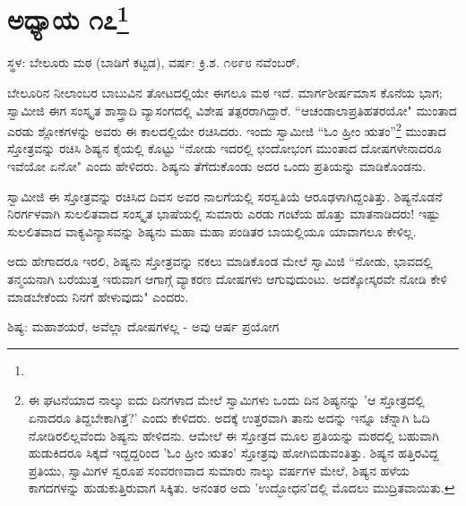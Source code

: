 \newpage

\chapter[ಅಧ್ಯಾಯ ೧೭]{ಅಧ್ಯಾಯ ೧೭\protect\footnote{}}

\centerline{ಸ್ಥಳ: ಬೇಲೂರು ಮಠ (ಬಾಡಿಗೆ ಕಟ್ಟಡ), ವರ್ಷ: ಕ್ರಿ.ಶ. ೧೮೯೮ ನವೆಂಬರ್.}

ಬೇಲೂರಿನ ನೀಲಾಂಬರ ಬಾಬುವಿನ ತೋಟದಲ್ಲಿಯೇ ಈಗಲೂ ಮಠ ಇದೆ. ಮಾರ್ಗಶೀರ್ಷಮಾಸ ಕೊನೆಯ ಭಾಗ; ಸ್ವಾಮೀಜಿ ಈಗ ಸಂಸ್ಕೃತ ಶಾಸ್ತ್ರಾದಿ ವ್ಯಾಸಂಗದಲ್ಲಿ ವಿಶೇಷ ತತ್ಪರರಾಗಿದ್ದಾರೆ. “ಆಚಂಡಾಲಾಪ್ರತಿಹತರಯೋ" ಮುಂತಾದ ಎರಡು ಶ್ಲೋಕಗಳನ್ನು ಅವರು ಈ ಕಾಲದಲ್ಲಿಯೇ ರಚಿಸಿದರು. ಇಂದು ಸ್ವಾಮೀಜಿ “ಓಂ ಹ್ರೀಂ ಋತಂ”\footnote{ಈ ಘಟನೆಯಾದ ನಾಲ್ಕು ಐದು ದಿನಗಳಾದ ಮೇಲೆ ಸ್ವಾಮಿಗಳು ಒಂದು ದಿನ ಶಿಷ್ಯನನ್ನು 'ಆ ಸ್ತೋತ್ರದಲ್ಲಿ ಏನಾದರೂ ತಿದ್ದಬೇಕಾಗಿತ್ತೆ?' ಎಂದು ಕೇಳಿದರು. ಅದಕ್ಕೆ ಉತ್ತರವಾಗಿ ತಾನು ಅದನ್ನು ಇನ್ನೂ ಚೆನ್ನಾಗಿ ಓದಿ ನೋಡಿರಲಿಲ್ಲವೆಂದು ಶಿಷ್ಯನು ಹೇಳಿದನು. ಆಮೇಲೆ ಈ ಸ್ತೋತ್ರದ ಮೂಲ ಪ್ರತಿಯನ್ನು ಮಠದಲ್ಲಿ ಬಹುವಾಗಿ ಹುಡುಕಿದರೂ ಸಿಕ್ಕದೆ ಇದ್ದದ್ದರಿಂದ 'ಓಂ ಹ್ರೀಂ ಋತಂ' ಸ್ತೋತ್ರವು ಹೋಗಿಬಿಡುವಂತಿತ್ತು. ಶಿಷ್ಯನ ಹತ್ತಿರವಿದ್ದ ಪ್ರತಿಯು, ಸ್ವಾಮಿಗಳ ಸ್ವರೂಪ ಸಂವರಣವಾದ ಸುಮಾರು ನಾಲ್ಕು ವರ್ಷಗಳ ಮೇಲೆ, ಶಿಷ್ಯನ ಹಳೆಯ ಕಾಗದಗಳನ್ನು ಹುಡುಕುತ್ತಿರುವಾಗ ಸಿಕ್ಕಿತು. ಅನಂತರ ಅದು 'ಉದ್ಭೋಧನ'ದಲ್ಲಿ ಮೊದಲು ಮುದ್ರಿತವಾಯಿತು.} ಮುಂತಾದ ಸ್ತೋತ್ರವನ್ನು ರಚಿಸಿ ಶಿಷ್ಯನ ಕೈಯಲ್ಲಿ ಕೊಟ್ಟು “ನೋಡು ಇದರಲ್ಲಿ ಛಂದೋಭಂಗ ಮುಂತಾದ ದೋಷಗಳೇನಾದರೂ ಇವೆಯೋ ಏನೋ" ಎಂದು ಹೇಳಿದರು. ಶಿಷ್ಯನು ತೆಗೆದುಕೊಂಡು ಅದರ ಒಂದು ಪ್ರತಿಯನ್ನು ಮಾಡಿಕೊಂಡನು.

ಸ್ವಾಮೀಜಿ ಈ ಸ್ತೋತ್ರವನ್ನು ರಚಿಸಿದ ದಿವಸ ಅವರ ನಾಲಗೆಯಲ್ಲಿ ಸರಸ್ವತಿಯೆ ಆರೂಢಳಾಗಿದ್ದಂತಿತ್ತು. ಶಿಷ್ಯನೊಡನೆ ನಿರರ್ಗಳವಾಗಿ ಸುಲಲಿತವಾದ ಸಂಸ್ಕೃತ ಭಾಷೆಯಲ್ಲಿ ಸುಮಾರು ಎರಡು ಗಂಟೆಯ ಹೊತ್ತು ಮಾತನಾಡಿದರು! ಇಷ್ಟು ಸುಲಲಿತವಾದ ವಾಕ್ಯವಿನ್ಯಾಸವನ್ನು ಶಿಷ್ಯನು ಮಹಾ ಮಹಾ ಪಂಡಿತರ ಬಾಯಲ್ಲಿಯೂ ಯಾವಾಗಲೂ ಕೇಳಿಲ್ಲ.

ಅದು ಹೇಗಾದರೂ ಇರಲಿ, ಶಿಷ್ಯನು ಸ್ತೋತ್ರವನ್ನು ನಕಲು ಮಾಡಿಕೊಂಡ ಮೇಲೆ ಸ್ವಾಮಿಜಿ “ನೋಡು, ಭಾವದಲ್ಲಿ ತನ್ಮಯನಾಗಿ ಬರೆಯುತ್ತ ಇರುವಾಗ ಆಗಾಗ್ಗೆ ವ್ಯಾಕರಣ ದೋಷಗಳು ಆಗುವುದುಂಟು. ಅದಕ್ಕೋಸ್ಕರವೇ ನೋಡಿ ಕೇಳಿ ಮಾಡಬೇಕೆಂದು ನಿನಗೆ ಹೇಳುವುದು" ಎಂದರು.

ಶಿಷ್ಯ: ಮಹಾಶಯರೆ, ಅವೆಲ್ಲಾ ದೋಷಗಳಲ್ಲ - ಅವು ಆರ್ಷ ಪ್ರಯೋಗ

